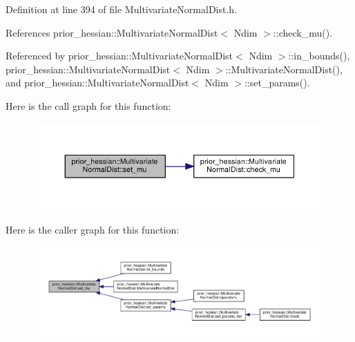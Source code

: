 Definition at line 394 of file Multivariate\+Normal\+Dist.\+h.



References prior\+\_\+hessian\+::\+Multivariate\+Normal\+Dist$<$ Ndim $>$\+::check\+\_\+mu().



Referenced by prior\+\_\+hessian\+::\+Multivariate\+Normal\+Dist$<$ Ndim $>$\+::in\+\_\+bounds(), prior\+\_\+hessian\+::\+Multivariate\+Normal\+Dist$<$ Ndim $>$\+::\+Multivariate\+Normal\+Dist(), and prior\+\_\+hessian\+::\+Multivariate\+Normal\+Dist$<$ Ndim $>$\+::set\+\_\+params().



Here is the call graph for this function\+:\nopagebreak
\begin{figure}[H]
\begin{center}
\leavevmode
\includegraphics[width=350pt]{classprior__hessian_1_1MultivariateNormalDist_a3a232f67a79457c91ce1c061a19d18bc_cgraph}
\end{center}
\end{figure}




Here is the caller graph for this function\+:\nopagebreak
\begin{figure}[H]
\begin{center}
\leavevmode
\includegraphics[width=350pt]{classprior__hessian_1_1MultivariateNormalDist_a3a232f67a79457c91ce1c061a19d18bc_icgraph}
\end{center}
\end{figure}


